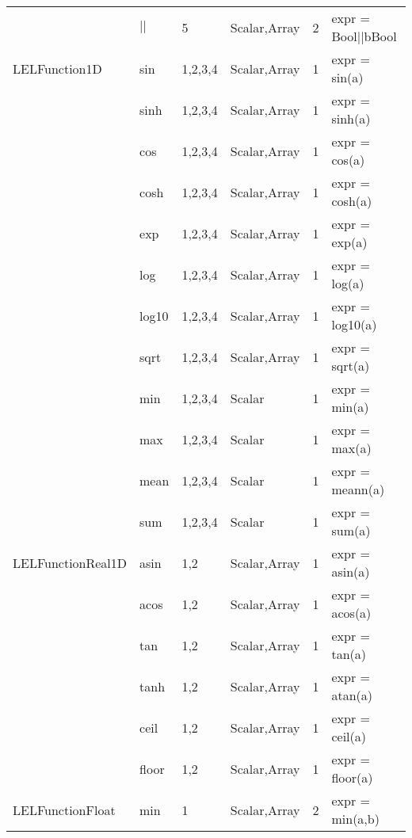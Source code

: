 \begin{center}
\begin{tabular}{|l|l|l|l|l|l}
                 &     $||$       &   5          &   Scalar,Array   &   2   &   expr = Bool$||$bBool \\
LELFunction1D &        sin      &   1,2,3,4    &   Scalar,Array   &   1   &   expr = sin(a) \\  
               &       sinh     &   1,2,3,4    &   Scalar,Array   &   1   &   expr = sinh(a) \\ 
                &      cos      &   1,2,3,4    &   Scalar,Array   &   1   &   expr = cos(a) \\  
                 &     cosh     &   1,2,3,4    &   Scalar,Array   &   1   &   expr = cosh(a) \\   
                  &    exp      &   1,2,3,4    &   Scalar,Array   &   1   &   expr = exp(a) \\   
              &        log      &   1,2,3,4    &   Scalar,Array   &   1   &   expr = log(a) \\
               &       log10    &   1,2,3,4    &   Scalar,Array   &   1   &   expr = log10(a) \\
                &      sqrt     &   1,2,3,4    &   Scalar,Array   &   1   &   expr = sqrt(a) \\
                 &     min      &   1,2,3,4    &   Scalar         &   1   &   expr = min(a) \\
              &        max      &   1,2,3,4    &   Scalar         &   1   &   expr = max(a) \\
               &       mean     &   1,2,3,4    &   Scalar         &   1   &   expr = meann(a) \\
                &      sum      &   1,2,3,4    &   Scalar         &   1   &   expr = sum(a) \\
LELFunctionReal1D &    asin     &   1,2        &   Scalar,Array   &   1   &   expr = asin(a) \\
                  &    acos     &   1,2        &   Scalar,Array   &   1   &   expr = acos(a) \\
                  &    tan      &   1,2        &   Scalar,Array   &   1   &   expr = tan(a) \\
                  &    tanh     &   1,2        &   Scalar,Array   &   1   &   expr = atan(a) \\
                  &    ceil     &   1,2        &   Scalar,Array   &   1   &   expr = ceil(a) \\
                  &    floor    &   1,2        &   Scalar,Array   &   1   &   expr = floor(a) \\
LELFunctionFloat  &    min      &   1          &   Scalar,Array   &   2   &   expr = min(a,b) \\

\end{tabular}
\end{center}
